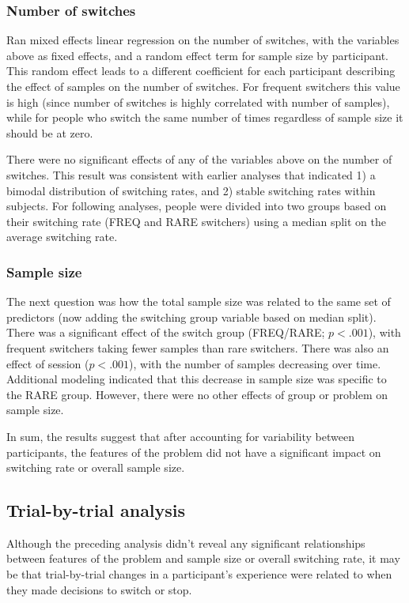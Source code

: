 \documentclass[english,doc]{apa}
\begin{document}
\subsubsection{Number of switches}

Ran mixed effects linear regression on the number of switches, with the variables above as fixed effects, and a random effect term for sample size by participant. 
This random effect leads to a different coefficient for each participant describing the effect of samples on the number of switches. 
For frequent switchers this value is high (since number of switches is highly correlated with number of samples), while for people who switch the same number of times regardless of sample size it should be at zero.

There were no significant effects of any of the variables above on the number of switches.
This result was consistent with earlier analyses that indicated 1) a bimodal distribution of switching rates, and 2) stable switching rates within subjects.
For following analyses, people were divided into two groups based on their switching rate (FREQ and RARE switchers) using a median split on the average switching rate.


\subsubsection{Sample size}

The next question was how the total sample size was related to the same set of predictors (now adding the switching group variable based on median split).
There was a significant effect of the switch group (FREQ/RARE; $p<.001$), with frequent switchers taking fewer samples than rare switchers. 
There was also an effect of session ($p<.001$), with the number of samples decreasing over time.
Additional modeling indicated that this decrease in sample size was specific to the RARE group. 
However, there were no other effects of group or problem on sample size.

In sum, the results suggest that after accounting for variability between participants, the features of the problem did not have a significant impact on switching rate or overall sample size.


\subsection{Trial-by-trial analysis}

Although the preceding analysis didn't reveal any significant relationships between features of the problem and sample size or overall switching rate, it may be that trial-by-trial changes in a participant's experience were related to when they made decisions to switch or stop.
\end{document}

